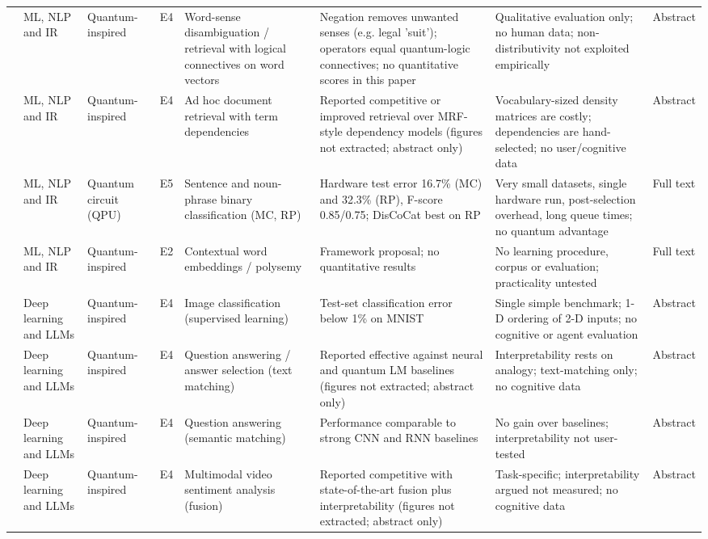 \documentclass[10pt,a4paper]{article}
\begin{document}
\begin{landscape}
\begin{longtable}{@{}P{3.0cm}P{2.2cm}P{2.1cm}P{0.6cm}P{4.2cm}P{4.6cm}P{4.4cm}P{1.0cm}@{}}
\citet{Widdows2003} & ML, NLP and IR & Quantum-inspired & E4 & Word-sense disambiguation / retrieval with logical connectives on word vectors & Negation removes unwanted senses (e.g. legal 'suit'); operators equal quantum-logic connectives; no quantitative scores in this paper & Qualitative evaluation only; no human data; non-distributivity not exploited empirically & Abstract \\
\citet{Sordoni2013} & ML, NLP and IR & Quantum-inspired & E4 & Ad hoc document retrieval with term dependencies & Reported competitive or improved retrieval over MRF-style dependency models (figures not extracted; abstract only) & Vocabulary-sized density matrices are costly; dependencies are hand-selected; no user/cognitive data & Abstract \\
\citet{Lorenz2023} & ML, NLP and IR & Quantum circuit (QPU) & E5 & Sentence and noun-phrase binary classification (MC, RP) & Hardware test error 16.7\% (MC) and 32.3\% (RP), F-score 0.85/0.75; DisCoCat best on RP & Very small datasets, single hardware run, post-selection overhead, long queue times; no quantum advantage & Full text \\
\citet{Svozil2025} & ML, NLP and IR & Quantum-inspired & E2 & Contextual word embeddings / polysemy & Framework proposal; no quantitative results & No learning procedure, corpus or evaluation; practicality untested & Full text \\
\citet{Stoudenmire2016} & Deep learning and LLMs & Quantum-inspired & E4 & Image classification (supervised learning) & Test-set classification error below 1\% on MNIST & Single simple benchmark; 1-D ordering of 2-D inputs; no cognitive or agent evaluation & Abstract \\
\citet{Zhang2018} & Deep learning and LLMs & Quantum-inspired & E4 & Question answering / answer selection (text matching) & Reported effective against neural and quantum LM baselines (figures not extracted; abstract only) & Interpretability rests on analogy; text-matching only; no cognitive data & Abstract \\
\citet{Li2019} & Deep learning and LLMs & Quantum-inspired & E4 & Question answering (semantic matching) & Performance comparable to strong CNN and RNN baselines & No gain over baselines; interpretability not user-tested & Abstract \\
\citet{Li2021a} & Deep learning and LLMs & Quantum-inspired & E4 & Multimodal video sentiment analysis (fusion) & Reported competitive with state-of-the-art fusion plus interpretability (figures not extracted; abstract only) & Task-specific; interpretability argued not measured; no cognitive data & Abstract \\

\end{longtable}
\end{landscape}
\end{document}
